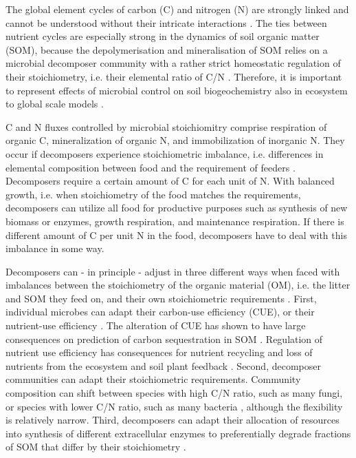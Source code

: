 
\introduction
The global element cycles of carbon (C) and nitrogen (N) are strongly linked and
cannot be understood without their intricate interactions
\citep{Thornton07,Janssens10, Zaehle11}.
The ties between nutrient cycles are especially strong in the dynamics of soil
organic matter (SOM), because the depolymerisation and mineralisation of SOM
relies on a microbial decomposer community with a rather strict homeostatic
regulation of their stoichiometry, i.e. their elemental ratio of C/N \citep{Sterner02,
Zechmeister15}. Therefore, it is important to represent effects of microbial
control on soil biogeochemistry also in ecosystem to global scale models
\citep{Todd-Brown12, Xu14}.  

C and N fluxes controlled by microbial stoichiomitry comprise respiration of
organic C, mineralization of organic N, and immobilization of inorganic N. They
occur if decomposers experience stoichiometric imbalance, i.e.
differences in elemental composition between food and the requirement of feeders
\citep{Sterner02}. Decomposers require a certain amount of C for each unit of N.
With balanced growth, i.e. when stoichiometry of the food matches the
requirements, decomposers can utilize all food for productive purposes such as
synthesis of new biomass or enzymes, growth respiration, and maintenance
respiration. If there is different amount of C per unit N in the food,
decomposers have to deal with this imbalance in some way.
 
Decomposers can - in principle - adjust in three different ways when faced with
imbalances between the stoichiometry of the organic material (OM), i.e. the
litter and SOM they feed on, and their own stoichiometric requirements
\citep{Mooshammer14}.
First, individual microbes can adapt their carbon-use efficiency (CUE), or their
nutrient-use efficiency \citep{Sinsabaugh13}. The alteration of CUE has
shown to have large consequences on prediction of carbon sequestration in SOM
\citep{Allison14a, Wieder13}.
Regulation of nutrient use efficiency has consequences for nutrient recycling
and loss of nutrients from the ecosystem \citep{Mooshammer14a} and soil plant
feedback \citep{Rastetter11}.
Second, decomposer communities can adapt their stoichiometric requirements.
Community composition can shift between species with high C/N ratio, such as
many fungi, or species with lower C/N ratio, such as many bacteria
\citep{Cleveland07, Xu13}, although the flexibility is relatively narrow.
Third, decomposers can adapt their allocation of resources into synthesis of
different extracellular enzymes to preferentially degrade fractions of SOM that
differ by their stoichiometry \citep{Moorhead12}. 

